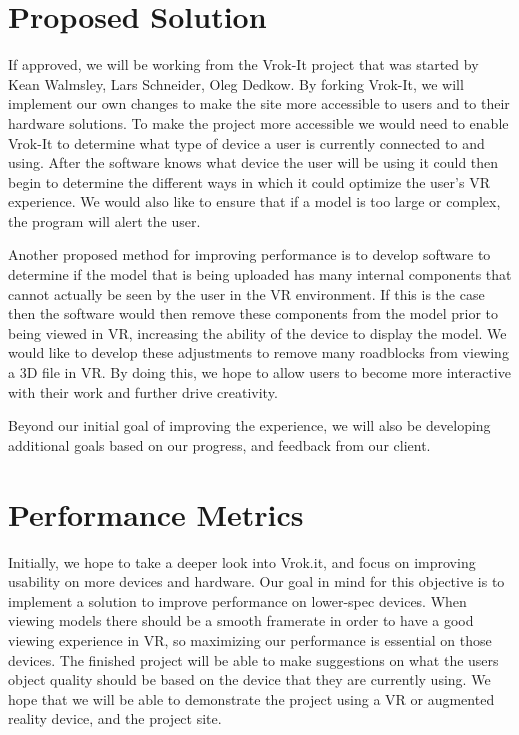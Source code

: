 \documentclass[letterpaper,10pt,draftclsnofoot,onecolumn, titlepage]{IEEEtran}
\begin{document}
\section{Proposed Solution}
{If approved, we will be working from the Vrok-It project that was started by Kean Walmsley, Lars Schneider, Oleg Dedkow. By forking Vrok-It, we will implement our own changes to make the site more accessible to users and to their hardware solutions. To make the project more accessible we would need to enable Vrok-It to determine what type of device a user is currently connected to and using. After the software knows what device the user will be using it could then begin to determine the different ways in which it could optimize the user’s VR experience. We would also like to ensure that if a model is too large or complex, the program will alert the user.

Another proposed method for improving performance is to develop software to determine if the model that is being uploaded has many internal components that cannot actually be seen by the user in the VR environment. If this is the case then the software would then remove these components from the model prior to being viewed in VR, increasing the ability of the device to display the model. We would like to develop these adjustments to remove many roadblocks from viewing a 3D file in VR. By doing this, we hope to allow users to become more interactive with their work and further drive creativity.

Beyond our initial goal of improving the experience, we will also be developing additional goals based on our progress, and feedback from our client. 
\par}
\section{Performance Metrics}
{Initially, we hope to take a deeper look into Vrok.it, and focus on improving usability on more devices and hardware. Our goal in mind for this objective is to implement a solution to improve performance on lower-spec devices. When viewing models there should be a smooth framerate in order to have a good viewing experience in VR, so maximizing our performance is essential on those devices. The finished project will be able to make suggestions on what the users object quality should be based on the device that they are currently using. We hope that we will be able to demonstrate the project using a VR or augmented reality device, and the project site. \par}
\end{document}
